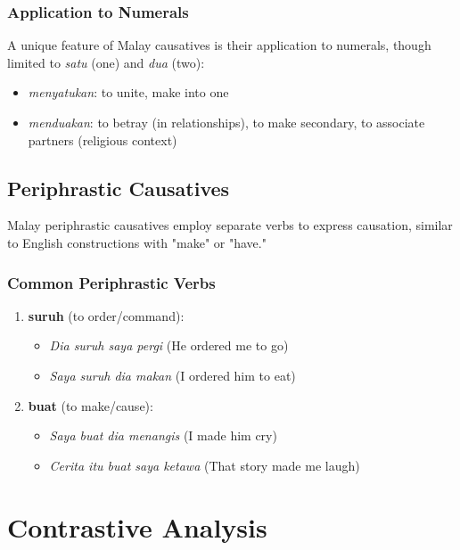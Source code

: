 \documentclass[12pt,a4paper]{article}
\begin{document}
\subsubsection{Application to Numerals}

A unique feature of Malay causatives is their application to numerals, though limited to \textit{satu} (one) and \textit{dua} (two):

\begin{itemize}
\item \textit{menyatukan}: to unite, make into one
\item \textit{menduakan}: to betray (in relationships), to make secondary, to associate partners (religious context)
\end{itemize}

\subsection{Periphrastic Causatives}

Malay periphrastic causatives employ separate verbs to express causation, similar to English constructions with "make" or "have."

\subsubsection{Common Periphrastic Verbs}

\begin{enumerate}
\item \textbf{suruh} (to order/command):
   \begin{itemize}
   \item \textit{Dia suruh saya pergi} (He ordered me to go)
   \item \textit{Saya suruh dia makan} (I ordered him to eat)
   \end{itemize}

\item \textbf{buat} (to make/cause):
   \begin{itemize}
   \item \textit{Saya buat dia menangis} (I made him cry)
   \item \textit{Cerita itu buat saya ketawa} (That story made me laugh)
   \end{itemize}
\end{enumerate}

\section{Contrastive Analysis}
\end{document}
